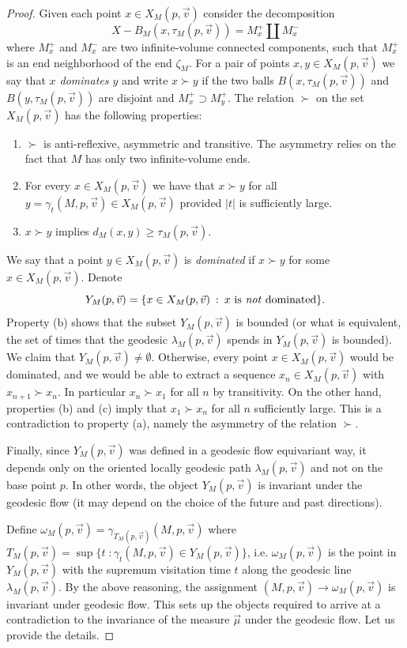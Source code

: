 \documentclass{amsart}
\theoremstyle{plain}
\numberwithin{equation}{section}
\theoremstyle{definition}
\begin{document}
\begin{proof}
Given each point  $x\in X_M(p,\vec v)$  consider the decomposition
$$X - B_M(x,\tau_M(p,\vec v)) = M_x^+ \amalg M_x^-$$ where $M_x^+$ and $M_x^-$ are two infinite-volume  connected components, such that $M_x^+$ is an end neighborhood of the end $\zeta_M$.
For a pair of points $x,y \in X_M(p,\vec v)$ we say that \emph{$x$ dominates $y$} and write $x \succ y$ if the two balls $B(x,\tau_M(p,\vec v))$ and $B(y,\tau_M(p,\vec v))$  are disjoint and $M_x^+ \supset M_y^+  $. The relation $\succ$ on the set $X_M(p,\vec v)$ has the following properties:
\begin{enumerate}[label=(\alph*)]
    \item $\succ$ is anti-reflexive, asymmetric and transitive. The asymmetry relies on the fact that $M$ has only two infinite-volume ends.
    \item For every $x \in X_M(p,\vec v)$ we have that $x \succ y$ for all $y=\gamma_t(M,p,\vec v) \in X_M(p,\vec v)$ provided $|t|$ is sufficiently large. 
    \item $x \succ y $ implies $d_M(x,y) \ge \tau_M(p,\vec v)$.
\end{enumerate} 
 

We say that a point $y \in X_M(p,\vec v)$ is \emph{dominated} if $x \succ y$ for some $x \in X_M(p,\vec v)$. Denote $$Y_M(p,\vec v) = \{x \in X_M(p,\vec v) \: : \: \text{$x$ is \emph{not} dominated} \}.$$ 
Property (b) shows that the subset $Y_M(p,\vec v)$ is bounded (or what is equivalent, the set of  times that the geodesic $\lambda_M(p,\vec v)$ spends in $Y_M(p,\vec v)$ is bounded). We claim that $Y_M(p,\vec v) \neq \emptyset$.  Otherwise, every point $x \in X_M(p,\vec v)$ would be dominated, and we would be able to extract a sequence $x_n \in X_M(p,\vec v)$ with $x_{n+1} \succ x_n$. In particular $x_n \succ x_1$ for all $n$ by transitivity. On the other hand, properties (b) and (c) imply that $x_1 \succ x_n$ for all $n$ sufficiently large. This is a contradiction to property (a), namely the asymmetry of the relation $\succ$.

Finally, since $Y_M(p,\vec v)$ was defined in a geodesic flow equivariant way, it  depends only on the oriented locally geodesic path $\lambda_M(p,\vec v)$ and not on the base point $p$. In other words, the object $Y_M(p,\vec v)$ is invariant under the geodesic flow (it may depend on the choice of the future and past directions).

Define $\omega_M(p,\vec v) = \gamma_{T_M(p,\vec v)}(M,p,\vec v)$ where $T_M(p,\vec v)=\sup \{  t\; : \gamma_t(M,p,\vec v)\in   Y_M(p,\vec v)\}$, i.e. $\omega_M(p,\vec v)$ is the point in $Y_M(p,\vec v)$ with the supremum visitation time $t$ along the geodesic line $\lambda_M(p,\vec v)$. By the above reasoning, the assignment $(M,p,\vec v) \to \omega_M(p,\vec v)$ is invariant under geodesic flow. This sets up the objects required to arrive at a contradiction to the invariance of the measure $\vec \mu$ under the geodesic flow. Let us provide the details.


\end{proof}
\end{document}
